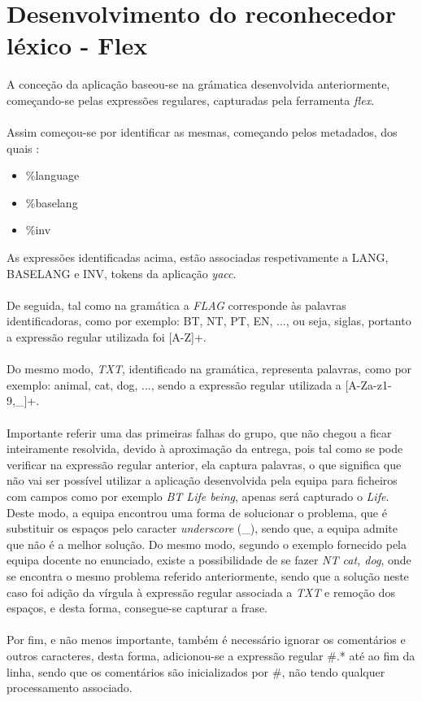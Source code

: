 \documentclass[11pt,a4paper]{report}%
\begin{document}
\section{Desenvolvimento do reconhecedor léxico - Flex}

A conceção da aplicação baseou-se na grámatica desenvolvida anteriormente, começando-se pelas expressões regulares, capturadas pela ferramenta \emph{flex}.\\\\
Assim começou-se por identificar as mesmas, começando pelos metadados, dos quais :
\begin{itemize}
    \item \%language
    \item \%baselang 
    \item \%inv
\end{itemize}

As expressões identificadas acima, estão associadas respetivamente a LANG, BASELANG e INV, tokens da aplicação \emph{yacc}.\\\\
De seguida, tal como na gramática a \emph{FLAG} corresponde às palavras identificadoras, como por exemplo: BT, NT, PT, EN, ..., ou seja, siglas, portanto a expressão regular utilizada foi [A-Z]+.\\\\ Do mesmo modo, \emph{TXT}, identificado na gramática, representa palavras, como por exemplo: animal, cat, dog, ..., sendo a expressão regular utilizada a [A-Za-z1-9,\_]+. \\\\Importante referir uma das primeiras falhas do grupo, que não chegou a ficar inteiramente resolvida, devido à aproximação da entrega, pois tal como se pode verificar na expressão regular anterior, ela captura palavras, o que significa que não vai ser possível utilizar a aplicação desenvolvida pela equipa para ficheiros com campos como por exemplo \emph{BT Life being}, apenas será capturado o \emph{Life}.\\Deste modo, a equipa encontrou uma forma de solucionar o problema, que é substituir os espaços pelo caracter \emph{underscore} (\_), sendo que, a equipa admite que não é a melhor solução. Do mesmo modo, segundo o exemplo fornecido pela equipa docente no enunciado, existe a possibilidade de se fazer \emph{NT cat, dog}, onde se encontra o mesmo problema referido anteriormente, sendo que a solução neste caso foi adição da vírgula à expressão regular associada a \emph{TXT} e remoção dos espaços, e desta forma, consegue-se capturar a frase.
\\\\Por fim, e não menos importante, também é necessário ignorar os comentários e outros caracteres, desta forma, adicionou-se a expressão regular \#.* até ao fim da linha, sendo que os comentários são inicializados por \#, não tendo qualquer processamento associado.
\end{document}
